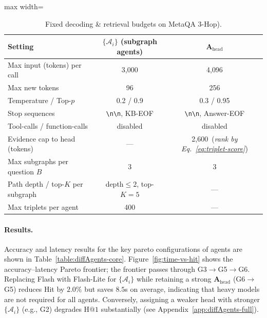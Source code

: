 \documentclass[sigconf]{acmart}
\begin{document}
\begin{table}[h]
  \centering
  \caption{Fixed decoding \& retrieval budgets on MetaQA 3-Hop).}
  \label{table:agent-budgets-metaqa}
  \vspace{-2mm}
  \begin{adjustbox}{max width=\columnwidth}
  \begin{tabular}{l|c|c}
    \toprule
    Setting & \(\{\mathcal{A}_i\}\) (subgraph agents) & \(\mathbf{A}_{\text{head}}\) \\
    \midrule
    Max input (tokens) per call & 3{,}000 & 4{,}096 \\
    Max new tokens & 96 & 256 \\
    Temperature / Top-$p$ & 0.2 / 0.9 & 0.3 / 0.95 \\
    Stop sequences & \texttt{\textbackslash n\textbackslash n}, KB-EOF & \texttt{\textbackslash n\textbackslash n}, Answer-EOF \\
    Tool-calls / function-calls & disabled & disabled \\
    Evidence cap to head (tokens) &  --- & 2{,}600 \,(\textit{rank by Eq.~\eqref{eq:triplet-score}}) \\
    Max subgraphs per question \(B\) & 3 & 3 \\
    Path depth / top-$K$ per subgraph & depth\(\le 2\), top-$K=5$ & --- \\
    Max triplets per agent & 400 & --- \\
    \bottomrule
  \end{tabular}
  \end{adjustbox}
  \vspace{-2mm}
\end{table}

\paragraph{Results.}
Accuracy and latency results for the key pareto configurations of agents are shown in Table~\ref{table:diffAgents-core}. Figure~\ref{fig:time-vs-hit} shows the accuracy--latency Pareto frontier; the frontier passes through
G3\(\rightarrow\)G5\(\rightarrow\)G6.
Replacing Flash with Flash-Lite for \(\{\mathcal{A}_i\}\) while retaining a strong \(\mathbf{A}_{\text{head}}\) (G6\(\rightarrow\)G5)
reduces Hit by \(2.0\%\) but saves \(\mathbf{8.5}\)s on average, indicating that heavy models are not required for all agents.
Conversely, assigning a weaker head with stronger \(\{\mathcal{A}_i\}\) (e.g., G2) degrades \(\text{H@1}\) substantially (see Appendix~\ref{app:diffAgents-full}).
\end{document}
